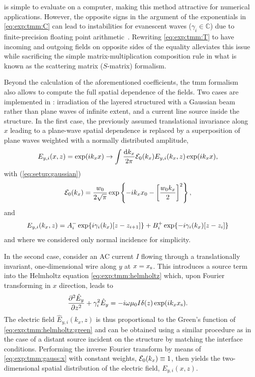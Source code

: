  is simple to evaluate on a computer, making this method attractive for numerical applications.
However, the opposite signs in the argument of the exponentials in \cref{eq:exp:tmm:C} can lead to instabilities for evanescent waves ($\gamma_i\in\mathbb{C}$) due to finite-precision floating point arithmetic~\cite{Duetz}.
Rewriting \cref{eq:exp:tmm:T} to have incoming and outgoing fields on opposite sides of the equality alleviates this issue while sacrificing the simple matrix-multiplication composition rule in what is known as the scattering matrix ($S$-matrix) formalism.

Beyond the calculation of the aforementioned coefficients, the \gls{tmm} formalism also allows to compute the full spatial dependence of the fields.
Two cases are implemented in \pymoosh: irradiation of the layered structured with a Gaussian beam rather than plane waves of infinite extent, and a current line source inside the structure.
In the first case, the previously assumed translational invariance along $x$ leading to a plane-wave spatial dependence is replaced by a superposition of plane waves weighted with a normally distributed amplitude,
\begin{equation}\label{eq:exp:tmm:gauss:x}
    E_{y,i}(x,z) = \exp(i k_x x)\rightarrow \int\frac{\dd{k_x}}{2\pi}\mathcal{E}_0(k_x) E_{y,i}(k_x, z)\exp(i k_x x),
\end{equation}
with (\cf \cref{eq:setup:gaussian})
\begin{equation}\label{eq:exp:tmm:gauss:ampl}
    \mathcal{E}_0(k_x) = \frac{w_0}{2\sqrt{\pi}}\exp\left\lbrace - i k_x x_0 -\left[\frac{w_0 k_x}{2}\right]^2\right\rbrace,
\end{equation}
and
\begin{equation}\label{eq:exp:tmm:gauss:z}
    E_{y,i}(k_x, z) = A_{i}^{-}\exp\lbrace i\gamma_i(k_x)[z-z_{i+1}]\rbrace + B_{i}^{+}\exp\lbrace -i\gamma_i(k_x)[z-z_{i}]\rbrace
\end{equation}
and where we considered only normal incidence for simplicity.

In the second case, \citet{Langevin2024} consider an AC current $I$ flowing through a translationally invariant, one-dimensional wire along $y$ at $x=x_{\mathrm{s}}$.
This introduces a source term into the Helmholtz equation \cref{eq:exp:tmm:helmholtz} which, upon Fourier transforming in $x$ direction, leads to
\begin{equation}\label{eq:exp:tmm:helmholtz:green}
    \pdv[2]{\hat{E}_y}{z} + \gamma_i^2\hat{E}_y = -i\omega\mu_0 I\delta(z)\exp(i k_x x_{\mathrm{s}}).
\end{equation}
The electric field $\hat{E}_{y,i}(k_x, z)$ is thus proportional to the Green's function of \cref{eq:exp:tmm:helmholtz:green} and can be obtained using a similar procedure as in the case of a distant source incident on the structure by matching the interface conditions.
Performing the inverse Fourier transform by means of \cref{eq:exp:tmm:gauss:x} with constant weights, $\mathcal{E}_0(k_x)\equiv 1$, then yields the two-dimensional spatial distribution of the electric field, $E_{y,i}(x, z)$.

